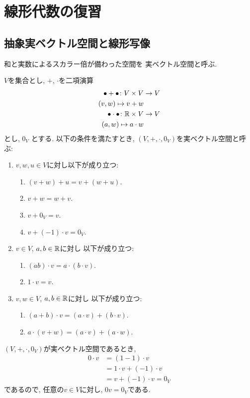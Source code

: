 
\chapter{線形代数の復習}

\section{抽象実ベクトル空間と線形写像}
和と実数によるスカラー倍が備わった空間を
実ベクトル空間と呼ぶ.
\begin{definition}
  $V$を集合とし,
  $+$, $\cdot$を二項演算
  \begin{align*}
    \bullet + \bullet \colon V\times V &\to V\\
    (v,w)\mapsto v+w\\
    \bullet \cdot \bullet \colon \mathbb{R}\times V &\to V\\
    (a,w)\mapsto a\cdot w
  \end{align*}
  とし,
  $0_V$
  とする.
  以下の条件を満たすとき,
  $(V,+,\cdot,0_V)$を実ベクトル空間と呼ぶ:
  \begin{enumerate}
  \item $v,w,u\in V$に対し以下が成り立つ:
    \begin{enumerate}
    \item $(v+w)+u=v+(w+u)$.
    \item $v+w=w+v$.
    \item $v+0_V=v$.
    \item $v+(-1)\cdot v=0_V$.
    \end{enumerate}
  \item $v\in V$, $a,b\in\mathbb{R}$に対し
    以下が成り立つ:
    \begin{enumerate}
    \item $(ab)\cdot v=a\cdot (b\cdot v)$.
    \item $1\cdot v=v$.
    \end{enumerate}      
  \item $v,w \in V$, $a,b\in\mathbb{R}$に対し
    以下が成り立つ:
    \begin{enumerate}
    \item $(a+b)\cdot v=(a\cdot v) + (b\cdot v)$.
    \item $a\cdot (v+w)=(a\cdot v) + (a\cdot w)$.
    \end{enumerate}      
  \end{enumerate}
\end{definition}
\begin{remark}
  $(V,+,\cdot,0_V)$が実ベクトル空間であるとき,
  \begin{align*}
    0\cdot v
    &=(1-1)\cdot v\\
    &=1\cdot v + (-1)\cdot v\\
    &=v+ (-1)\cdot v= 0_V
  \end{align*}
  であるので,
  任意の$v\in V$に対し, $0v=0_V$である.
\end{remark}
